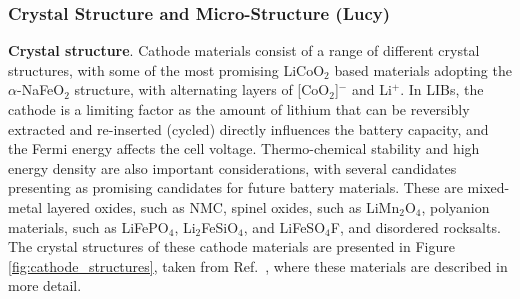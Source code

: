 \documentclass[../main.tex]{subfiles}
\begin{document}
\subsubsection{Crystal Structure and Micro-Structure (Lucy)}
\textbf{Crystal structure}. Cathode materials consist of a range of different crystal structures, with some of the most promising LiCoO$_2$ based materials adopting the $\alpha$-NaFeO$_2$ structure, with alternating layers of [CoO$_2$]$^-$ and Li$^+$. In LIBs, the cathode is a limiting factor as the amount of lithium that can be reversibly extracted and re-inserted (cycled) directly influences the battery capacity, and the Fermi energy affects the cell voltage. \cite{islam2014lithium} Thermo-chemical stability and high energy density are also important considerations, with several candidates presenting as promising candidates for future battery materials. These are mixed-metal layered oxides, such as NMC, spinel oxides, such as LiMn$_2$O$_4$, polyanion materials, such as LiFePO$_4$, \cite{whittingham2008materials,masquelier2013polyanionic,goodenough_li-ion_2013, zaghib2013review} Li$_2$FeSiO$_4$, \cite{nyten2005electrochemical,sirisopanaporn2011polymorphism,islam2011silicate} and LiFeSO$_4$F, \cite{padhi1997mapping} and disordered rocksalts.\cite{Jacquet2019, clement2020, Chang2020, Tygesen2020, Sharpe2020} The crystal structures of these cathode materials are presented in Figure \ref{fig:cathode_structures}, taken from Ref.~, where these materials are described in more detail.
\end{document}
